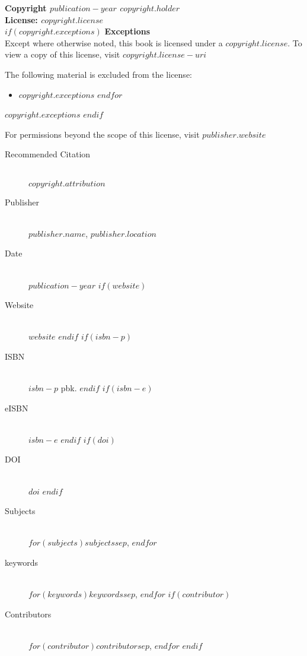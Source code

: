\documentclass{book}
\newcommand{\booklicense}{\href{$copyright.license-uri$}{$copyright.license$}}
\begin{document}
\begin{flushleft}

\textbf{Copyright \textcopyright{} $publication-year$  $copyright.holder$\\
License: \booklicense}\\[11pt] 

$if(copyright.exceptions)$
\textbf{Exceptions} \\

Except where otherwise noted, this book is licensed under a $copyright.license$. To view a copy of this license, visit $copyright.license-uri$

The following material is excluded from the license: 

\begin{itemize}
  $for(copyright.exceptions)$
  \item $copyright.exceptions$
  $endfor$
\end{itemize}

$copyright.exceptions$
$endif$

For permissions beyond the scope of this license, visit $publisher.website$

\vspace*{\fill}

\begin{description}
  \item[Recommended Citation] \hfill \\ $copyright.attribution$
  \item[Publisher] \hfill \\ $publisher.name$, $publisher.location$
  \item[Date] \hfill \\ $publication-year$
  $if(website)$
  \item[Website] \hfill \\ $website$
  $endif$
  $if(isbn-p)$
  \item[ISBN] \hfill \\ $isbn-p$ pbk.
  $endif$
  $if(isbn-e)$
  \item[eISBN] \hfill \\ $isbn-e$
  $endif$
  $if(doi)$
  \item[DOI] \hfill \\ \href{https://doi.org/$doi$}{$doi$}
  $endif$
  \item[Subjects] \hfill \\ $for(subjects)$$subjects$$sep$, $endfor$
  \item[keywords] \hfill \\ $for(keywords)$$keywords$$sep$, $endfor$
  $if(contributor)$
  \item[Contributors] \hfill \\ $for(contributor)$$contributor$$sep$, $endfor$
  $endif$


\end{description}
\end{flushleft}
\end{document}
